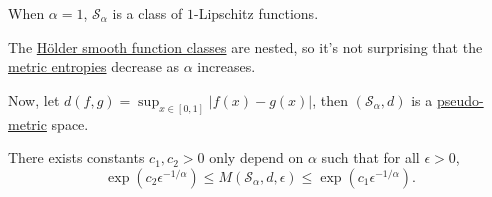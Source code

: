 \begin{note}
	When \(\alpha = 1\), \(\mathcal{S} _\alpha \) is a class of \(1\)-Lipschitz functions.
\end{note}

\begin{remark}
	The \hyperref[def:Holder-smooth-function-class]{Hölder smooth function classes} are nested, so it's not surprising that the \hyperref[def:metric-entropy]{metric entropies} decrease as \(\alpha \) increases.
\end{remark}

Now, let \(d(f, g) = \sup _{x\in [0, 1]} \vert f(x) - g(x) \vert \), then \((\mathcal{S} _\alpha , d)\) is a \hyperref[def:pseudo-metric]{pseudo-metric} space.

\begin{theorem}\label{thm:metric-entropy}
	There exists constants \(c_1, c_2 > 0\) only depend on \(\alpha \) such that for all \(\epsilon > 0\),
	\[
		\exp \left( c_2 \epsilon ^{-1 / \alpha } \right)
		\leq M(\mathcal{S} _\alpha , d, \epsilon )
		\leq \exp \left( c_1 \epsilon ^{-1 / \alpha } \right) .
	\]
\end{theorem}
